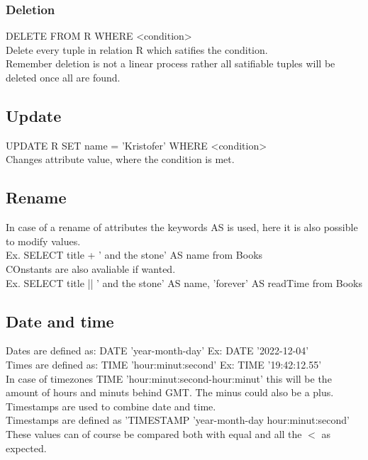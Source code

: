\documentclass[12pt, a4paper]{article}
\begin{document}
			\subsubsection{Deletion}
				DELETE FROM R WHERE <condition>\\
				Delete every tuple in relation R which satifies the condition.\\
				Remember deletion is not a linear process rather all satifiable tuples will be deleted once all are found.
			\subsection{Update}
				UPDATE R SET name = 'Kristofer' WHERE <condition>\\
				Changes attribute value, where the condition is met.
		\subsection{Rename}
			In case of a rename of attributes the keywords AS is used, here it is also possible to modify values.\\
			Ex. SELECT title + ' and the stone' AS name from Books\\
			COnstants are also avaliable if wanted.\\
			Ex. SELECT title || ' and the stone' AS name, 'forever' AS readTime from Books\\
		\subsection{Date and time}
			Dates are defined as: DATE 'year-month-day' Ex: DATE '2022-12-04'\\
			Times are defined as: TIME 'hour:minut:second' Ex: TIME '19:42:12.55'\\
			In case of timezones TIME 'hour:minut:second-hour:minut' this will be the amount of hours and minuts behind GMT. The minus could also be a plus.\\
			Timestamps are used to combine date and time.\\
			Timestamps are defined as 'TIMESTAMP 'year-month-day hour:minut:second'\\
			These values can of course be compared both with equal and all the $<$ as expected.
\end{document}
